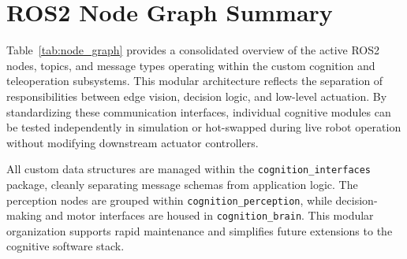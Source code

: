 \section{ROS2 Node Graph Summary}
Table~\ref{tab:node_graph} provides a consolidated overview of the active ROS2 nodes, topics, and message types operating within the custom cognition and teleoperation subsystems. This modular architecture reflects the separation of responsibilities between edge vision, decision logic, and low-level actuation. By standardizing these communication interfaces, individual cognitive modules can be tested independently in simulation or hot-swapped during live robot operation without modifying downstream actuator controllers.

\begin{table}[H]
\centering
\caption{Deployed ROS2 Nodes, Topics, and Services}
\label{tab:node_graph}
\end{table}

All custom data structures are managed within the \texttt{cognition\_interfaces} package, cleanly separating message schemas from application logic. The perception nodes are grouped within \texttt{cognition\_perception}, while decision-making and motor interfaces are housed in \texttt{cognition\_brain}. This modular organization supports rapid maintenance and simplifies future extensions to the cognitive software stack.

